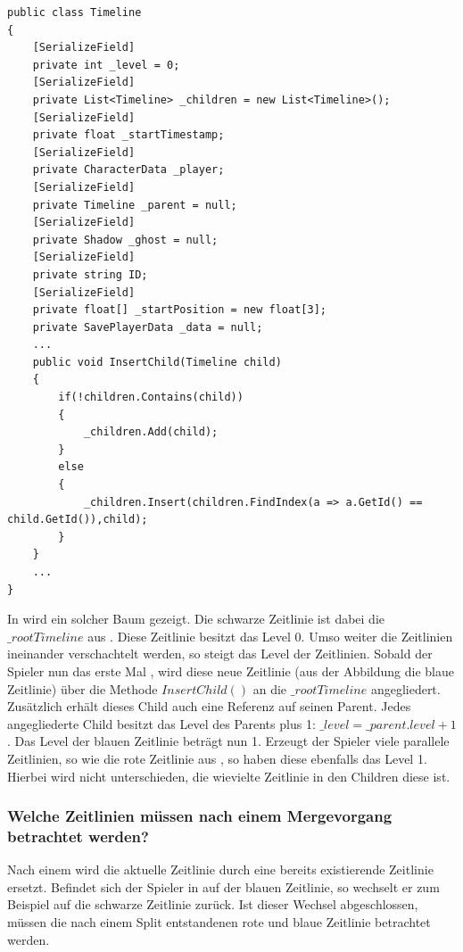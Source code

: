 \newpage
\begin{lstlisting}[caption={Ausschnitt aus Timeline.cs aus dem alten Prototyp}, label={lst:old_timeline}]
public class Timeline
{
    [SerializeField]
    private int _level = 0;
    [SerializeField]
    private List<Timeline> _children = new List<Timeline>();
    [SerializeField]
    private float _startTimestamp;
    [SerializeField]
    private CharacterData _player;
    [SerializeField]
    private Timeline _parent = null;
    [SerializeField]
    private Shadow _ghost = null;
    [SerializeField]
    private string ID;
    [SerializeField]
    private float[] _startPosition = new float[3];
    private SavePlayerData _data = null;
    ...
    public void InsertChild(Timeline child)
    {
        if(!children.Contains(child))
        {
            _children.Add(child);
        }
        else
        {
            _children.Insert(children.FindIndex(a => a.GetId() == child.GetId()),child);
        }
    }
    ...
}
\end{lstlisting}

In  wird ein solcher Baum gezeigt. Die schwarze Zeitlinie ist dabei die $\_rootTimeline$ aus . Diese Zeitlinie besitzt das Level 0. Umso weiter die Zeitlinien ineinander verschachtelt werden, so steigt das Level der Zeitlinien. Sobald der Spieler nun das erste Mal , wird diese neue Zeitlinie (aus der Abbildung die blaue Zeitlinie) über die Methode $InsertChild()$ an die $\_rootTimeline$ angegliedert. Zusätzlich erhält dieses Child auch eine Referenz auf seinen Parent. Jedes angegliederte Child besitzt das Level des Parents plus 1: $\_level = \_parent.level +1$. Das Level der blauen Zeitlinie beträgt nun 1. Erzeugt der Spieler viele parallele  Zeitlinien, so wie die rote Zeitlinie aus , so haben diese ebenfalls das Level 1. Hierbei wird nicht unterschieden, die wievielte Zeitlinie in den Children diese ist. 

\subsubsection{Welche Zeitlinien müssen nach einem Mergevorgang betrachtet werden?}\label{sec:good_02}
Nach einem  wird die aktuelle Zeitlinie durch eine bereits existierende Zeitlinie ersetzt. Befindet sich der Spieler in  auf der blauen Zeitlinie, so wechselt er zum Beispiel auf die schwarze Zeitlinie zurück. Ist dieser Wechsel abgeschlossen, müssen die nach einem Split entstandenen rote und blaue Zeitlinie betrachtet werden.

